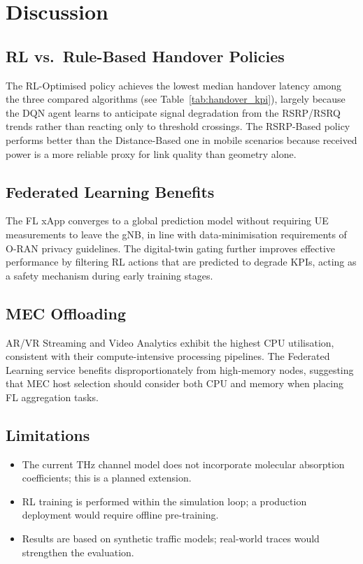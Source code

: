 \section{Discussion}
\label{sec:discussion}

\subsection{RL vs.\ Rule-Based Handover Policies}
The RL-Optimised policy achieves the lowest median handover latency among
the three compared algorithms (see Table~\ref{tab:handover_kpi}), largely
because the DQN agent learns to anticipate signal degradation from the
RSRP/RSRQ trends rather than reacting only to threshold crossings.
The RSRP-Based policy performs better than the Distance-Based one in mobile
scenarios because received power is a more reliable proxy for link quality
than geometry alone.

\subsection{Federated Learning Benefits}
The FL xApp converges to a global prediction model without requiring UE
measurements to leave the gNB, in line with data-minimisation
requirements of O-RAN privacy guidelines.
The digital-twin gating further improves effective performance by filtering
RL actions that are predicted to degrade KPIs, acting as a safety
mechanism during early training stages.

\subsection{MEC Offloading}
AR/VR Streaming and Video Analytics exhibit the highest CPU utilisation,
consistent with their compute-intensive processing pipelines.
The Federated Learning service benefits disproportionately from high-memory
nodes, suggesting that MEC host selection should consider both CPU and
memory when placing FL aggregation tasks.

\subsection{Limitations}
\begin{itemize}
  \item The current THz channel model does not incorporate molecular
        absorption coefficients; this is a planned extension.
  \item RL training is performed within the simulation loop; a
        production deployment would require offline pre-training.
  \item Results are based on synthetic traffic models; real-world
        traces would strengthen the evaluation.
\end{itemize}

